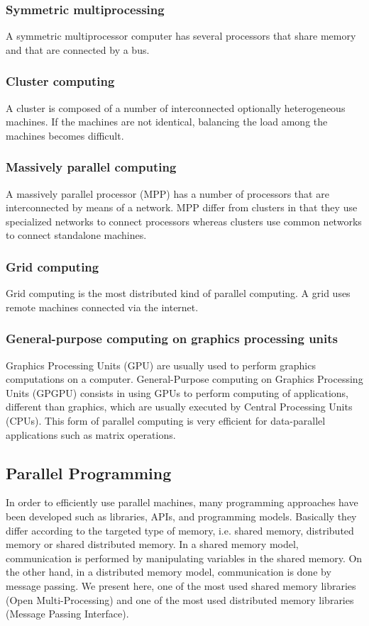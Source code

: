 \subsubsection{Symmetric multiprocessing}
A symmetric multiprocessor computer has several processors that share memory and that are connected by a bus.

\subsubsection{Cluster computing}
A cluster is composed of a number of interconnected optionally heterogeneous machines. If the machines are not identical, balancing the load among the machines becomes difficult.

\subsubsection{Massively parallel computing}
A massively parallel processor (MPP) has a number of processors that are interconnected by means of a network. MPP differ from clusters in that they use specialized networks to connect processors whereas clusters use common networks to connect standalone machines.

\subsubsection{Grid computing}
Grid computing is the most distributed kind of parallel computing. A grid uses remote machines connected via the internet.  
 
\subsubsection{General-purpose computing on graphics processing units}
Graphics Processing Units (GPU) are usually used to perform graphics computations on a computer. General-Purpose computing on Graphics Processing Units (GPGPU) consists in using GPUs to perform computing of applications, different than graphics, which are usually executed by Central Processing Units (CPUs). This form of parallel computing  is very efficient for data-parallel applications such as matrix operations.

\subsection{Parallel Programming}

In order to efficiently use parallel machines, many programming approaches have been developed such as libraries, APIs, and programming models. Basically they differ according to the targeted type of memory, i.e. shared memory, distributed memory or shared distributed memory. In a shared memory model, communication is performed by manipulating variables in the shared memory. On the other hand, in a distributed memory model, communication is done by message passing. We present here, one of the most used shared memory libraries (Open Multi-Processing) and one of the most used distributed memory libraries (Message Passing Interface).

